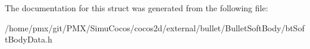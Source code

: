 The documentation for this struct was generated from the following file\+:\begin{DoxyCompactItemize}
\item 
/home/pmx/git/\+P\+M\+X/\+Simu\+Cocos/cocos2d/external/bullet/\+Bullet\+Soft\+Body/bt\+Soft\+Body\+Data.\+h\end{DoxyCompactItemize}
